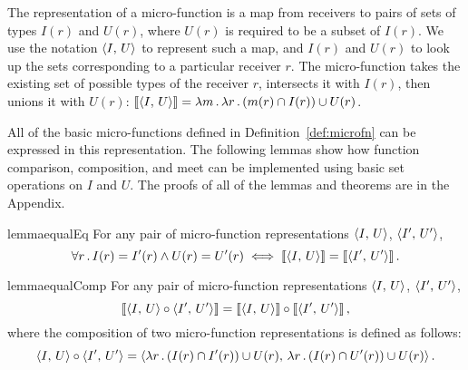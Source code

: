 The representation of a micro-function is a map from receivers to pairs of sets of
types $I(r)$ and $U(r)$, where $U(r)$ is required to be a subset of $I(r)$. 
We use the notation
$\left\langle I,\,U\right\rangle$ to represent such a map, and $I(r)$ and $U(r)$ to look up the
sets corresponding to a particular receiver $r$.
The micro-function takes the existing set of possible types of the
receiver $r$, intersects it with $I(r)$, then unions it with $U(r)$:
$\left\llbracket\left\langle I,\,U\right\rangle\right\rrbracket = \lambda m\,.\,\lambda r\,.\,(m(r) \cap I(r)) \cup U(r)$.


All of the basic micro-functions defined in Definition~\ref{def:microfn} can be expressed
in this representation. The following lemmas show how function comparison, composition, and meet can be implemented using basic set operations
on $I$ and $U$.
The proofs of all of the lemmas and theorems are in the Appendix.


\begin{restatable}{lemma}{equalEq}
\label{lem:equalEq}
    For any pair of micro-function representations $\left\langle I,\,U\right\rangle$, $\left\langle I',\,U'\right\rangle$,
    \begin{equation}
        \forall r\,.\,I(r) = I'(r) \land U(r) = U'(r)
        \iff
        \left\llbracket\left\langle I,\,U\right\rangle\right\rrbracket = \left\llbracket\left\langle I',\,U'\right\rangle\right\rrbracket.
    \end{equation}
\end{restatable}

\begin{restatable}{lemma}{equalComp}\label{lem:equalComp}
    For any pair of micro-function representations $\left\langle I,\,U\right\rangle$, $\left\langle I',\,U'\right\rangle$,
    \[
        \left\llbracket\left\langle I,\,U\right\rangle \circ \left\langle I',\,U'\right\rangle\right\rrbracket
        = 
        \left\llbracket\left\langle I,\,U\right\rangle\right\rrbracket \circ \left\llbracket\left\langle I',\,U'\right\rangle\right\rrbracket,
    \]
    where the composition of two micro-function representations is defined as follows:
$$\left\langle I,\,U\right\rangle \circ \left\langle I',\,U'\right\rangle = \left\langle \lambda r\,.\,(I(r) \cap I'(r))\cup U(r),\,\lambda r\,.\,(I(r)\cap U'(r))\cup U(r)\right\rangle.$$
\end{restatable}

